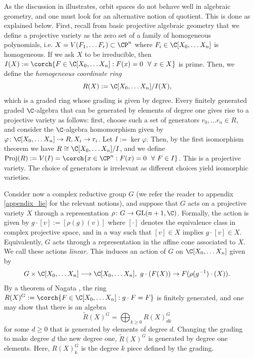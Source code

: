 As the discussion in \parencite{hoskins} illustrates, orbit spaces do not behave well in algebraic geometry, and one must look for an alternative notion of quotient. This is done as explained below. First, recall from basic projective algebraic geometry that we define a projective variety as the zero set of a family of homogeneous polynomials, i.e. \(X=V(F_1, \ldots F_r) \subset \CP^{n}\) where \(F_i\in \C[X_0, \ldots X_n]\) is homogeneous. If we ask \(X\) to be irreducible, then \(I(X):=\corch{F \in \C[X_0, \ldots X_n]: F(x)=0 \ \ \forall \ x \in X}\) is prime. Then, we define the \textit{homogeneous coordinate ring}
\[
R(X):=\C[X_0, \ldots X_n]/I(X),
\]
which is a graded ring whose grading is given by degree. Every finitely generated graded \(\C\)-algebra that can be generated by elements of degree one gives rise to a projective variety as follows: first, choose such a set of generators \(r_0, \ldots r_n\in R\), and consider the \(\C\)-algebra homomorphism given by \(\varphi\colon \C[X_0, \ldots X_n]\to R, X_i \to r_i\). Let \(I:=\ker \varphi\). Then, by the first isomorphism theorem we have \(R\cong \C[X_0, \ldots X_n]/I\), and we define \(\mathrm{Proj}(R):=V(I)=\corch{x\in \CP^n: F(x)=0 \ \ \forall \ F \in I}\). This is a projective variety. The choice of generators is irrelevant as different choices yield isomorphic varieties. 

Consider now a complex reductive group \(G\) (we refer the reader to appendix \ref{appendix_lie} for the relevant notions), and suppose that \(G\) acts on a projective variety \(X\) through a representation \(\rho\colon G \to \mathrm{GL}(n+1, \C)\). Formally, the action is given by \(g\cdot [v]:=[\rho(g)(v)]\) where \([\cdot]\) denotes the equivalence class in complex projective space, and in a way such that \([v]\in X\) implies \(g\cdot[v]\in X\). Equivalently, \(G\) acts through a representation in the affine cone associated to \(X\). We call these actions \textit{linear}. This induces an action of \(G\) on \(\C[X_0, \ldots X_n]\) given by
\[
G \times \C[X_0, \ldots X_n] \longrightarrow \C[X_0, \ldots X_n], \ g\cdot (F(X)) \to F(\rho(g^{-1})\cdot (X)).
\]
By a theorem of Nagata \parencite{nagata1963invariants}, the ring  \(R(X)^G:=\corch{F\in \C[X_0, \ldots X_n]: g\cdot F=F } \) is finitely generated, and one may show that there is an algebra 
\[
\tilde{R}(X)^G=\bigoplus_{k \ge 0} R(X)^G_{dk}
\]
for some \(d \geq 0\) that is generated by elements of degree \(d\). Changing the grading to make degree \(d\) the new degree one, \(\tilde{R}(X)^G\) is generated by degree one elements. Here, \(R(X)^G_k\) is the degree \(k\) piece defined by the grading.


